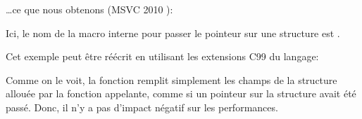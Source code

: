 \dots ce que nous obtenons (MSVC 2010 \Ox):



Ici, le nom de la macro interne pour passer le pointeur sur une structure est .

Cet exemple peut être réécrit en utilisant les extensions C99 du langage:





Comme on le voit, la fonction remplit simplement les champs de la structure allouée
par la fonction appelante, comme si un pointeur sur la structure avait été passé.
Donc, il n'y a pas d'impact négatif sur les performances.

